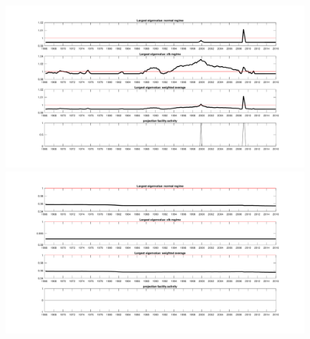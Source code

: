 \documentclass[12pt,reqno]{article}
\numberwithin{equation}{section}
\begin{document}
\begin{figure}[H]
\includegraphics[scale=0.23]{sw_ar1_eigenvalues.pdf}
\includegraphics[scale=0.23]{sw_msv_eigenvalues.pdf}
\end{figure}
\end{document}
